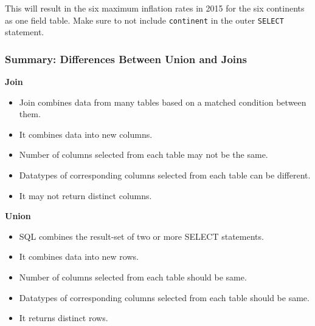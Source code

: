 \documentclass[
]{article}
\providecommand{\tightlist}{%
  \setlength{\itemsep}{0pt}\setlength{\parskip}{0pt}}
\begin{document}
This will result in the six maximum inflation rates in 2015 for the six
continents as one field table. Make sure to not include
\texttt{continent} in the outer \texttt{SELECT} statement.

\hypertarget{summary-differences-between-union-and-joins}{%
\subsubsection{Summary: Differences Between Union and
Joins}\label{summary-differences-between-union-and-joins}}

\textbf{Join}

\begin{itemize}
\tightlist
\item
  Join combines data from many tables based on a matched condition
  between them.
\item
  It combines data into new columns.
\item
  Number of columns selected from each table may not be the same.
\item
  Datatypes of corresponding columns selected from each table can be
  different.
\item
  It may not return distinct columns.
\end{itemize}

\textbf{Union}

\begin{itemize}
\tightlist
\item
  SQL combines the result-set of two or more SELECT statements.
\item
  It combines data into new rows.
\item
  Number of columns selected from each table should be same.
\item
  Datatypes of corresponding columns selected from each table should be
  same.
\item
  It returns distinct rows.
\end{itemize}
\end{document}
